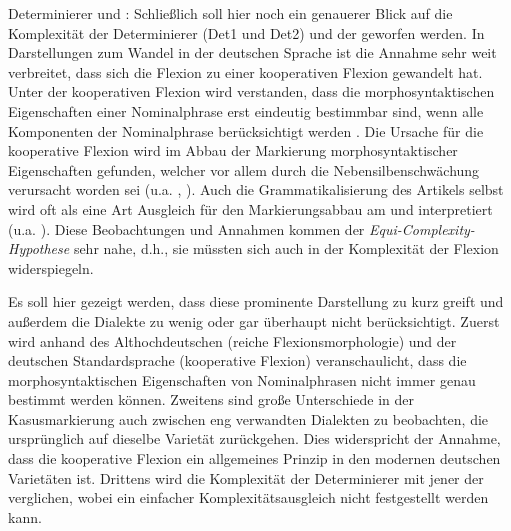 {Determinierer und :} Schließlich soll hier noch ein genauerer Blick auf die Komplexität der Determinierer (Det1 und Det2) und der  geworfen werden. In Darstellungen zum Wandel in der deutschen Sprache ist die Annahme sehr weit verbreitet, dass sich die Flexion zu einer kooperativen Flexion gewandelt hat. Unter der kooperativen Flexion wird verstanden, dass die morphosyntaktischen Eigenschaften einer Nominalphrase erst eindeutig bestimmbar sind, wenn alle Komponenten der Nominalphrase berücksichtigt werden \citep[107]{Szczepaniak2011}. Die Ursache für die kooperative Flexion wird im Abbau der Markierung morphosyntaktischer Eigenschaften gefunden, welcher vor allem durch die Nebensilbenschwächung verursacht worden sei (u.a. \citealt[233]{Schmidt2004}, \citealt[108]{Szczepaniak2011}). Auch die Grammatikalisierung des Artikels selbst wird oft als eine Art Ausgleich für den Markierungsabbau am  und  interpretiert (u.a. \citealt[233]{Schmidt2004}). Diese Beobachtungen und Annahmen kommen der \textit{Equi-Com\-ple\-xi\-ty-Hy\-po\-the\-se} sehr nahe, d.h., sie müssten sich auch in der Komplexität der Flexion widerspiegeln.

Es soll hier gezeigt werden, dass diese prominente Darstellung zu kurz greift und außerdem die Dialekte zu wenig oder gar überhaupt nicht berücksichtigt. Zuerst wird anhand des Althochdeutschen (reiche Flexionsmorphologie) und der deutschen Standardsprache (kooperative Flexion) veranschaulicht, dass die morphosyntaktischen Eigenschaften von Nominalphrasen nicht immer genau bestimmt werden können. Zweitens sind große Unterschiede in der Kasusmarkierung auch zwischen eng verwandten Dialekten zu beobachten, die ursprünglich auf dieselbe Varietät zurückgehen. Dies widerspricht der Annahme, dass die kooperative Flexion ein allgemeines Prinzip in den modernen deutschen Varietäten ist. Drittens wird die Komplexität der Determinierer mit jener der  verglichen, wobei ein einfacher Komplexitätsausgleich nicht festgestellt werden kann.

